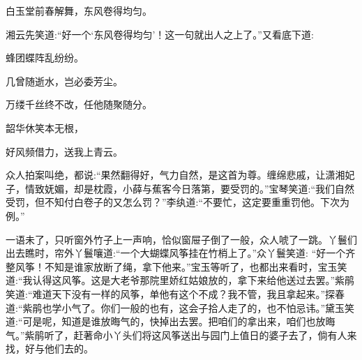 \begin{poem}
    \begin{pl}白玉堂前春解舞，东风卷得均匀。\end{pl}
\end{poem}


\begin{parag}
    湘云先笑道:“好一个‘东风卷得均匀’！这一句就出人之上了。”又看底下道:
\end{parag}


\begin{poem}
    \begin{pl}蜂团蝶阵乱纷纷。\end{pl}

    \begin{pl}几曾随逝水，岂必委芳尘。\end{pl}

    \begin{pl}万缕千丝终不改，任他随聚随分。\end{pl}

    \begin{pl}韶华休笑本无根，\end{pl}

    \begin{pl}好风频借力，送我上青云。\end{pl}


\end{poem}


\begin{parag}
    众人拍案叫绝，都说:“果然翻得好，气力自然，是这首为尊。缠绵悲戚，让潇湘妃子，情致妩媚，却是枕霞，小薛与蕉客今日落第，要受罚的。”宝琴笑道:“我们自然受罚，但不知付白卷子的又怎么罚？”李纨道:“不要忙，这定要重重罚他。下次为例。”
\end{parag}


\begin{parag}
    一语未了，只听窗外竹子上一声响，恰似窗屉子倒了一般，众人唬了一跳。丫鬟们出去瞧时，帘外丫鬟嚷道:“一个大蝴蝶风筝挂在竹梢上了。”众丫鬟笑道: “好一个齐整风筝！不知是谁家放断了绳，拿下他来。”宝玉等听了，也都出来看时，宝玉笑道:“我认得这风筝。这是大老爷那院里娇红姑娘放的，拿下来给他送过去罢。”紫鹃笑道:“难道天下没有一样的风筝，单他有这个不成？我不管，我且拿起来。”探春道:“紫鹃也学小气了。你们一般的也有，这会子拾人走了的，也不怕忌讳。”黛玉笑道:“可是呢，知道是谁放晦气的，快掉出去罢。把咱们的拿出来，咱们也放晦气。”紫鹃听了，赶著命小丫头们将这风筝送出与园门上值日的婆子去了，倘有人来找，好与他们去的。
\end{parag}


